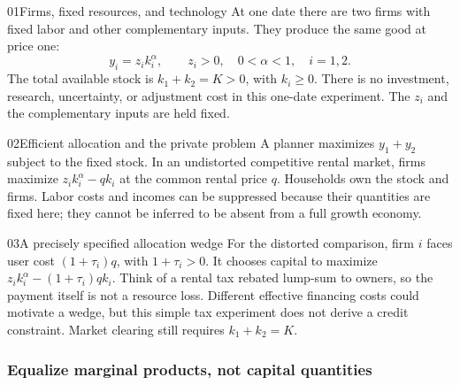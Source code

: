 \begin{modelsetup}[1]
\begin{modelcondition}{01}{Firms, fixed resources, and technology}
At one date there are two firms with fixed labor and other complementary
inputs. They produce the same good at price one:
\[
y_i=z_i k_i^\alpha,\qquad z_i>0,\quad0<\alpha<1,\quad i=1,2.
\]
The total available stock is $k_1+k_2=K>0$, with $k_i\geq0$.
There is no investment, research, uncertainty, or adjustment cost in this
one-date experiment. The $z_i$ and the complementary inputs are held fixed.
\end{modelcondition}
\begin{modelcondition}{02}{Efficient allocation and the private problem}
A planner maximizes $y_1+y_2$ subject to the fixed stock. In an undistorted
competitive rental market, firms maximize $z_i k_i^\alpha-qk_i$ at the common
rental price $q$. Households own the stock and firms. Labor costs and incomes
can be suppressed because their quantities are fixed here; they cannot be
inferred to be absent from a full growth economy.
\end{modelcondition}
\begin{modelcondition}{03}{A precisely specified allocation wedge}
For the distorted comparison, firm $i$ faces user cost $(1+\tau_i)q$, with
$1+\tau_i>0$. It chooses capital to maximize
$z_i k_i^\alpha-(1+\tau_i)qk_i$. Think of a rental tax rebated lump-sum to
owners, so the payment itself is not a resource loss. Different effective
financing costs could motivate a wedge, but this simple tax experiment does
not derive a credit constraint. Market clearing still requires $k_1+k_2=K$.
\end{modelcondition}
\end{modelsetup}

\subsubsection{Equalize marginal products, not capital quantities}

